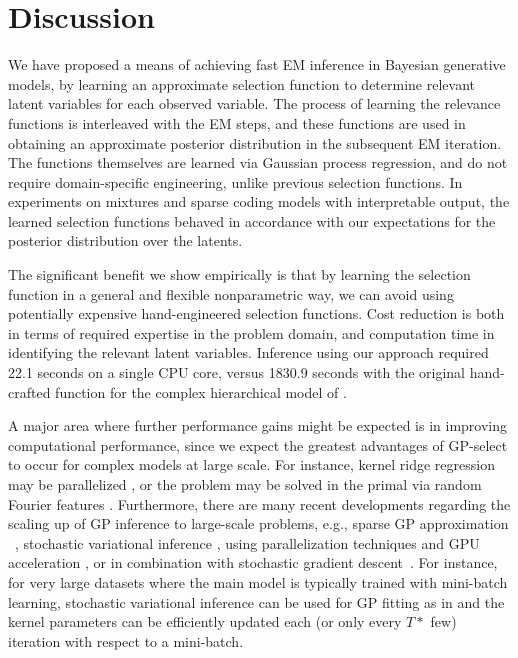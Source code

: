 \section{Discussion}
\label{disc}
%
We have proposed a means of achieving fast EM inference in Bayesian generative models, by
learning an approximate selection function to determine relevant latent variables
for each observed variable. The process of learning the relevance functions
is interleaved with the EM steps, and these functions
are used in obtaining an approximate posterior distribution in the subsequent EM iteration.
The functions themselves are learned via Gaussian process regression,
and do not require domain-specific engineering, unlike previous selection functions.
In experiments on mixtures and sparse coding models with interpretable output,
the learned selection functions behaved in accordance with our expectations for the posterior
distribution over the latents.  

The significant benefit we show empirically is that by learning the selection function in a general and flexible nonparametric way, we can avoid using potentially expensive hand-engineered selection functions.
Cost reduction is both in terms of required expertise in the problem domain, and computation time in identifying the relevant latent variables.
Inference using our approach required 22.1 seconds on a single CPU core, versus  1830.9 seconds with the original hand-crafted function 
for the complex hierarchical model of \citep{DaiEtAl2013}.

A major area where further performance gains might be expected is in
improving computational performance, since we expect the greatest
advantages of GP-select to occur for complex models at large scale. For instance,
 kernel ridge regression may be parallelized \citep{zhang14divide},
or the problem may be solved in the primal via random Fourier features \citep{LeSarSmo13}.
Furthermore, there are many recent developments regarding the scaling up of GP inference to large-scale problems, e.g., sparse GP approximation
~\citep{sparseGP}, stochastic variational inference \citep{HensmanEtAl2013,Hensman2012}, using parallelization techniques and GPU acceleration \citep{DaiEtAl2014}, or in combination with stochastic gradient descent~\citep{Bottou08thetradeoffs}. 
For instance, for very large datasets where the main model is typically trained with mini-batch learning, stochastic variational inference can be used for GP fitting as in \citep{HensmanEtAl2013} and the kernel parameters can be efficiently updated each (or only every $T*$ few) iteration with respect to a mini-batch.



